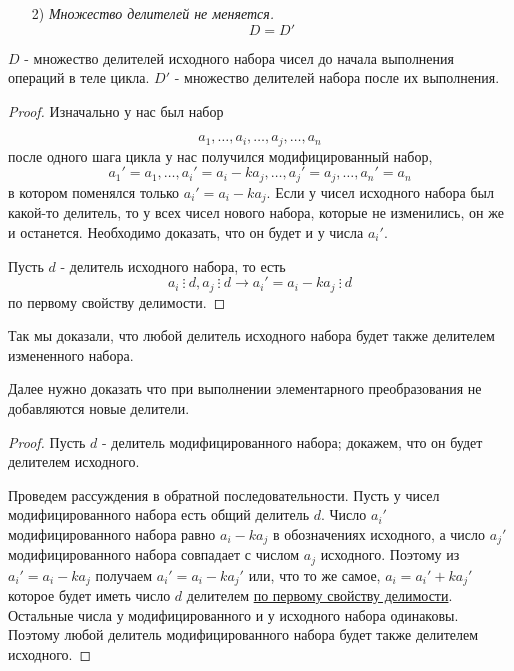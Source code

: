 \documentclass[russian]{lecture-notes}
\begin{document}
\begin{itemize}
    \item[2)] \emph{Множество делителей не меняется.}
    \[D = D'\]
\end{itemize}

$D$ - множество делителей исходного набора чисел до начала выполнения операций в теле цикла. $D'$ - множество делителей набора после их выполнения.

\begin{proof}
Изначально у нас был набор

\[a_1,\ldots,a_i,\ldots,a_j,\ldots,a_n\]
после одного шага цикла у нас получился модифицированный набор,
\[a_1' = a_1,\ldots,a_i'=a_i-ka_j,\ldots,a_j' = a_j,\ldots,a_n' = a_n\]
в котором поменялся только $a_i'=a_i-ka_j$. Если у чисел исходного набора был какой-то делитель, то у всех чисел нового набора, которые не изменились, он же и останется. Необходимо доказать, что он будет и у числа $a_i'$.

Пусть $d$ - делитель исходного набора, то есть \[a_i \ \vdots \ d, a_j \ \vdots \ d \rightarrow a_i'=a_i-ka_j \ \vdots \ d\] по первому свойству делимости.
\end{proof}
Так мы доказали, что любой делитель исходного набора будет также делителем измененного набора.

Далее нужно доказать что при выполнении элементарного преобразования не добавляются новые делители.

\begin{proof}
Пусть $d$ - делитель модифицированного набора; докажем, что он будет делителем исходного.

Проведем рассуждения в обратной последовательности. Пусть у чисел модифицированного набора есть общий делитель $d$. Число $a_i'$  модифицированного набора равно $a_i - ka_j$  в обозначениях исходного, а число $a_j'$ модифицированного набора совпадает с числом $a_j$ исходного. Поэтому из $a_i'=a_i-ka_j$  получаем $a_i'=a_i-ka_j'$ или, что то же самое, ${a_i=a_i'+ka_j'}$  которое будет иметь число $d$ делителем \hyperref[sv:1]{по первому свойству делимости}. Остальные числа у модифицированного и у исходного набора одинаковы. Поэтому любой делитель модифицированного набора будет также делителем исходного.
\end{proof}

\end{document}
